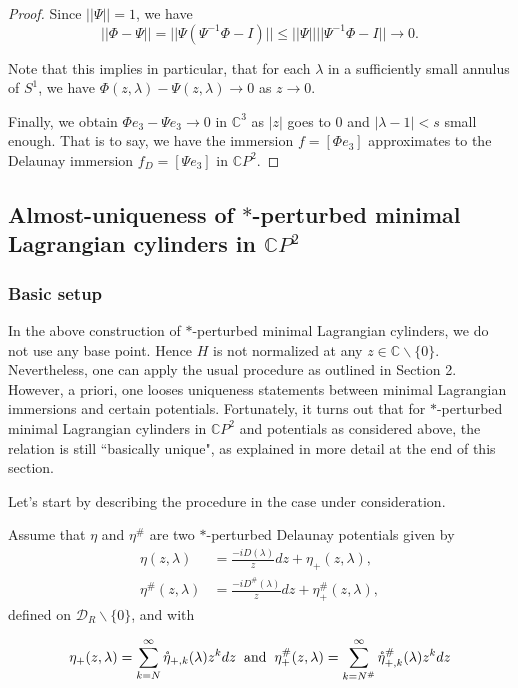 \documentclass[a4paper,11pt]{amsart}
\theoremstyle{definition}
\numberwithin{equation}{section}
\newcommand{\C}{\mathbb{C}}
\begin{document}
\begin{proof}
Since $||\Psi||=1$, we have
$$||\Phi-\Psi||=||\Psi (\Psi^{-1} \Phi - I) ||\leq ||\Psi|| ||\Psi^{-1} \Phi - I ||
\rightarrow 0.$$

Note that this implies in particular, that for each $\lambda$  in a sufficiently small annulus of  $S^1$,  we have $\Phi(z, \lambda)-\Psi (z, \lambda) \rightarrow 0$ as $z \rightarrow 0$.

Finally, we obtain $\Phi e_3 -\Psi e_3\rightarrow 0$ in $\mathbb{C}^3$ as $|z|$ goes to $0$ and $|\lambda-1|< s$ small enough.  That is to say, we have the immersion $f=[\Phi e_3]$ approximates to the Delaunay immersion $f_D=[\Psi e_3]$ in $\mathbb{C}P^2$. 
\end{proof}
\subsection{Almost-uniqueness of $*$-perturbed minimal Lagrangian cylinders in \texorpdfstring{$\C P^2$}{}}
\subsubsection{\textbf{Basic setup}}
In the above construction of $*$-perturbed minimal Lagrangian cylinders, we do not use any base point. Hence $H$ is not normalized at any $z\in \C\backslash \{0\}$. Nevertheless, one can apply the usual procedure as outlined in Section 2.  However, a priori, one looses uniqueness statements between minimal Lagrangian immersions and certain potentials.
 Fortunately, it turns out that for  $*$-perturbed minimal Lagrangian cylinders in $\C P^2$ and potentials as considered above, the relation is still ``basically unique", as explained in more detail at the end of this section.
 


Let's start by describing the procedure in the case under consideration.

Assume that  $\eta$ and $\eta^{\#}$ are two  $*$-perturbed Delaunay potentials given by
\begin{equation}
\begin{aligned}
\eta(z,\lambda)&=\frac{-iD(\lambda)}{z}dz+\eta_+(z,\lambda),\\
\eta^{\#}(z,\lambda)&=\frac{-iD^{\#}(\lambda)}{z} dz+\eta_+^{\#}(z,\lambda),
\end{aligned} 
\end{equation}
defined on $\mathcal{D}_R\backslash\{0\}$,  and with

 
 $$\eta_+(z,\lambda)=
\sum_{k=N}^{\infty}  \mathring{\eta}_{+,k}(\lambda)  z^k dz \hspace{2mm}\mbox{and} \hspace{2mm} 
\eta_+^{\#}(z,\lambda)=\sum_{k=N^{\#}}^{\infty}  \mathring{\eta}_{+,k}^{\#}(\lambda)  z^k dz$$
\end{document}
